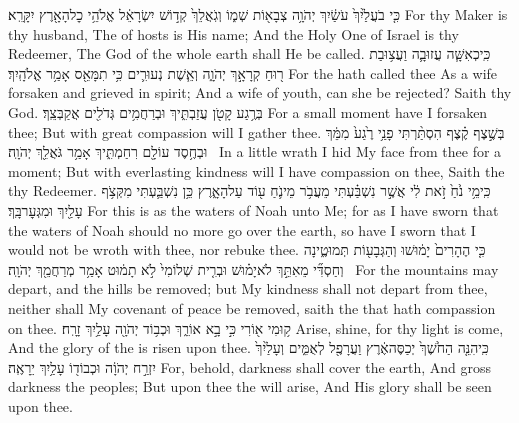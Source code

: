 {כִּ֤י בֹעֲלַ֙יִךְ֙ עֹשַׂ֔יִךְ יְהֹוָ֥ה צְבָא֖וֹת שְׁמ֑וֹ וְגֹֽאֲלֵךְ֙ קְד֣וֹשׁ יִשְׂרָאֵ֔ל אֱלֹהֵ֥י כׇל\maqqaf הָאָ֖רֶץ יִקָּרֵֽא׃}
{For thy Maker is thy husband, The \lord\space of hosts is His name; And the Holy One of Israel is thy Redeemer, The God of the whole earth shall He be called.}
{כִּֽי\maqqaf כְאִשָּׁ֧ה עֲזוּבָ֛ה וַעֲצ֥וּבַת ר֖וּחַ קְרָאָ֣ךְ יְהֹוָ֑ה וְאֵ֧שֶׁת נְעוּרִ֛ים כִּ֥י תִמָּאֵ֖ס אָמַ֥ר אֱלֹהָֽיִךְ׃}
{For the \lord\space hath called thee As a wife forsaken and grieved in spirit; And a wife of youth, can she be rejected? Saith thy God.}
{בְּרֶ֥גַע קָטֹ֖ן עֲזַבְתִּ֑יךְ וּבְרַחֲמִ֥ים גְּדֹלִ֖ים אֲקַבְּצֵֽךְ׃}
{For a small moment have I forsaken thee; But with great compassion will I gather thee.}
{בְּשֶׁ֣צֶף קֶ֗צֶף הִסְתַּ֨רְתִּי פָנַ֥י רֶ֙גַע֙ מִמֵּ֔ךְ וּבְחֶ֥סֶד עוֹלָ֖ם רִחַמְתִּ֑יךְ אָמַ֥ר גֹּאֲלֵ֖ךְ יְהֹוָֽה׃ \setuma }
{In a little wrath I hid My face from thee for a moment; But with everlasting kindness will I have compassion on thee, Saith the \lord\space thy Redeemer.}
{כִּֽי\maqqaf מֵ֥י נֹ֙חַ֙ זֹ֣את לִ֔י אֲשֶׁ֣ר נִשְׁבַּ֗עְתִּי מֵעֲבֹ֥ר מֵי\maqqaf נֹ֛חַ ע֖וֹד עַל\maqqaf הָאָ֑רֶץ כֵּ֥ן נִשְׁבַּ֛עְתִּי מִקְּצֹ֥ף עָלַ֖יִךְ וּמִגְּעׇר\maqqaf בָּֽךְ׃}
{For this is as the waters of Noah unto Me; for as I have sworn that the waters of Noah should no more go over the earth, so have I sworn that I would not be wroth with thee, nor rebuke thee.}
{כִּ֤י הֶהָרִים֙ יָמ֔וּשׁוּ וְהַגְּבָע֖וֹת תְּמוּטֶ֑ינָה וְחַסְדִּ֞י מֵאִתֵּ֣ךְ לֹא\maqqaf יָמ֗וּשׁ וּבְרִ֤ית שְׁלוֹמִי֙ לֹ֣א תָמ֔וּט אָמַ֥ר מְרַחֲמֵ֖ךְ יְהֹוָֽה׃ \setuma }
{For the mountains may depart, and the hills be removed; but My kindness shall not depart from thee, neither shall My covenant of peace be removed, saith the \lord\space that hath compassion on thee.}
\label{haft_50}
\setcounter{chap}{60}
\setcounter{verse}{1}
{ק֥וּמִי א֖וֹרִי כִּ֣י בָ֣א אוֹרֵ֑ךְ וּכְב֥וֹד יְהֹוָ֖ה עָלַ֥יִךְ זָרָֽח׃}
{Arise, shine, for thy light is come, And the glory of the \lord\space is risen upon thee.}
{כִּֽי\maqqaf הִנֵּ֤ה הַחֹ֙שֶׁךְ֙ יְכַסֶּה\maqqaf אֶ֔רֶץ וַעֲרָפֶ֖ל לְאֻמִּ֑ים וְעָלַ֙יִךְ֙ יִזְרַ֣ח יְהֹוָ֔ה וּכְבוֹד֖וֹ עָלַ֥יִךְ יֵרָאֶֽה׃}
{For, behold, darkness shall cover the earth, And gross darkness the peoples; But upon thee the \lord\space will arise, And His glory shall be seen upon thee.}
